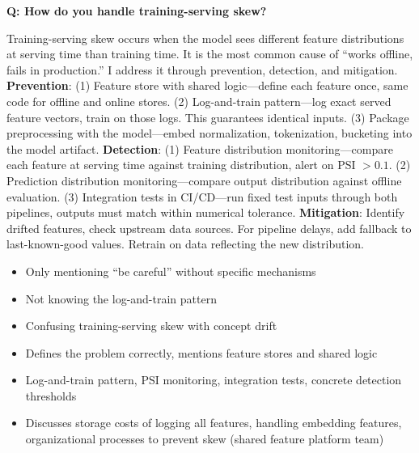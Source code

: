 \begin{interviewq}
\textbf{Q: How do you handle training-serving skew?}

 \quad {} \quad \badgefreq{\freqhigh}

\stronganswer Training-serving skew occurs when the model sees different feature distributions at serving time than training time. It is the most common cause of ``works offline, fails in production.'' I address it through prevention, detection, and mitigation. \textbf{Prevention}: (1) Feature store with shared logic---define each feature once, same code for offline and online stores. (2) Log-and-train pattern---log exact served feature vectors, train on those logs. This guarantees identical inputs. (3) Package preprocessing with the model---embed normalization, tokenization, bucketing into the model artifact. \textbf{Detection}: (1) Feature distribution monitoring---compare each feature at serving time against training distribution, alert on PSI $> 0.1$. (2) Prediction distribution monitoring---compare output distribution against offline evaluation. (3) Integration tests in CI/CD---run fixed test inputs through both pipelines, outputs must match within numerical tolerance. \textbf{Mitigation}: Identify drifted features, check upstream data sources. For pipeline delays, add fallback to last-known-good values. Retrain on data reflecting the new distribution.

\redflags
\begin{itemize}
    \item Only mentioning ``be careful'' without specific mechanisms
    \item Not knowing the log-and-train pattern
    \item Confusing training-serving skew with concept drift
\end{itemize}


\goodgreat
\begin{itemize}
    \item {} Defines the problem correctly, mentions feature stores and shared logic
    \item {} Log-and-train pattern, PSI monitoring, integration tests, concrete detection thresholds
    \item {} Discusses storage costs of logging all features, handling embedding features, organizational processes to prevent skew (shared feature platform team)
\end{itemize}

\end{interviewq}

